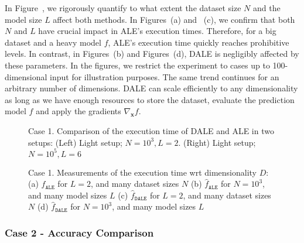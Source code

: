 \documentclass[wcp]{jmlr}
\newcommand{\dale}{\hat{f}_{\mathtt{DALE}}}
\newcommand{\xb}{\mathbf{x}} \newcommand{\R}{\mathbb{R}}
\begin{document}
In Figure~, we rigorously quantify to what
extent the dataset size \(N\) and the model size \(L\) affect both
methods. In Figures~(a) and
~(c), we confirm that both \(N\) and \(L\)
have crucial impact in ALE's execution times. Therefore, for a big
dataset and a heavy model \(f\), ALE's execution time quickly reaches
prohibitive levels. In contrast, in
Figures~(b) and
Figures~(d), DALE is negligibly affected by
these parameters. In the figures, we restrict the experiment to cases
up to 100-dimensional input for illustration purposes. The same trend
continues for an arbitrary number of dimensions. DALE can scale
efficiently to any dimensionality as long as we have enough resources
to store the dataset, evaluate the prediction model \(f\) and apply
the gradients \(\nabla_{\xb}f\).

\begin{figure}[h]
  \centering
  \resizebox{.4\columnwidth}{!}{}
  \resizebox{.43\columnwidth}{!}{}
  \caption[Case-1-fig-1]{Case 1. Comparison of the execution time of DALE
    and ALE in two setups: (Left) Light setup; \(N=10^3, L=2\).
    (Right) Light setup; \(N=10^5, L=6\)}
  \label{fig:case-1-plots-1}
\end{figure}

\begin{figure}[h]
  \centering
  \resizebox{.23\columnwidth}{!}{}
  \resizebox{.23\columnwidth}{!}{}
  \resizebox{.23\columnwidth}{!}{}
  \resizebox{.23\columnwidth}{!}{}
  \caption[Case-1-fig-2]{Case 1. Measurements of the execution time wrt dimensionality \(D\):
    (a) \(\hat{f}_{\mathtt{ALE}}\) for \(L = 2\), and many dataset sizes \(N\)
    (b) \(\hat{f}_{\mathtt{ALE}}\) for \(N = 10^3\), and many model sizes \(L\)
    (c) \(\dale\) for \(L = 2\), and many dataset sizes \(N\)
    (d) \(\dale\) for \(N = 10^3\), and many model sizes \(L\)
  }
  \label{fig:case-1-plots-2}
\end{figure}


\subsubsection{Case 2 - Accuracy Comparison}
\label{sec:example2}
\end{document}
